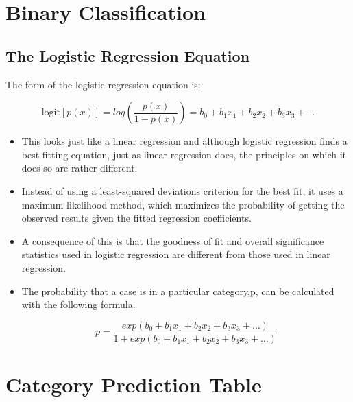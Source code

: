 \documentclass[a4paper,12pt]{article}
\begin{document}
	
\section*{Binary Classification}	


\subsection*{The Logistic Regression Equation}
The form of the logistic regression equation is:
\begin{framed}
	\[ \mbox{logit}[p(x)] =  log \left(\frac{p(x)}{1-p(x)} \right) = b_0 + b_1x_1 + b_2x_2 + b_3x_3 + \ldots \]
\end{framed}
\begin{itemize}
	\item This looks just like a linear regression and although logistic regression finds a best
	fitting equation, just as linear regression does, the principles on which it does so are
	rather different.
	\item  Instead of using a least-squared deviations criterion for the best fit, it
	uses a maximum likelihood method, which maximizes the probability of getting the
	observed results given the fitted regression coefficients.
	\item  A consequence of this is that the
	goodness of fit and overall significance statistics used in logistic regression are different
	from those used in linear regression.
	\item 
	The probability that a case is in a particular category,p, can be calculated with the following formula.
	
	\[p = \frac{exp(b_0 + b_1x_1 + b_2x_2 + b_3x_3 + \ldots)}{1 + exp(b_0 + b_1x_1 + b_2x_2 + b_3x_3 + \ldots)}\]
\end{itemize}


\newpage



\section*{Category Prediction Table}
\end{document}
